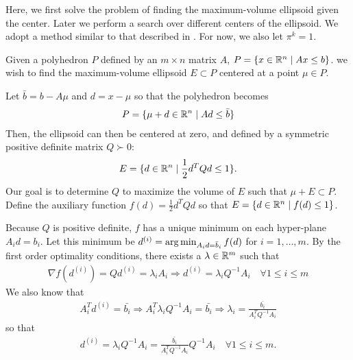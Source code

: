 Here, we first solve the problem of finding the maximum-volume ellipsoid given the center.
Later we perform a search over different centers of the ellipsoid.
We adopt a method similar to that described in \cite{Khachiyan1993}.
For now, we also let $\pi^k = 1$.

Given a polyhedron $P$ defined by an $m \times n$ matrix $A$, $P = \{ x \in \mathbb R^n\; | \;  Ax \le b \}$.
we wish to find the maximum-volume ellipsoid $E \subset P$ centered at a point $\mu \in P$.

Let $\bar{b} = b - A\mu$ and $d = x - \mu$ so that the polyhedron becomes
\begin{align*}
P = \{ \mu + d \in \mathbb R^n \; | \;  Ad \le \bar{b} \}
\end{align*}
Then, the ellipsoid can then be centered at zero, and defined by a symmetric positive definite matrix $Q \succ 0$:
\begin{align*}
E = \{ d \in \mathbb R^n \; | \; \frac 1 2 d^T Q d \le 1 \}.
\end{align*}
Our goal is to determine $Q$ to maximize the volume of $E$ such that $\mu + E \subset P$.
Define the auxiliary function $f(d) = \frac 1 2 d^T Q d$ so that $E = \{ d \in \mathbb R^n\; | \; f(d) \le 1 \}$.

Because $Q$ is positive definite, $f$ has a unique minimum on each hyper-plane $A_i d = b_i$.
Let this minimum be $d^{(i)} = \operatorname*{arg\,min}_{A_id =\bar{b}_i} f(d)$ for $i=1,\ldots,m$.
By the first order optimality conditions, there exists a $\lambda \in \mathbb R^m$ such that
\begin{align*}
\nabla f(d^{(i)}) = Q d^{(i)} = \lambda_i A_i 
\Longrightarrow d^{(i)} = \lambda_i Q^{-1}A_i \quad \forall 1\le i\le m
\end{align*}
We also know that
\begin{align*}
A_i^T d^{(i)} = \bar{b_i} \Longrightarrow
A_i^T \lambda_i Q^{-1}A_i = \bar{b_i} \Longrightarrow
\lambda_i = \frac {\bar{b_i}}{A_i^T  Q^{-1}A_i}
\end{align*}
so that
\begin{align*}
d^{(i)} = \lambda_i Q^{-1}A_i = \frac {\bar{b_i}}{A_i^T  Q^{-1}A_i}  Q^{-1}A_i \quad \forall 1\le i\le m.
\end{align*}

